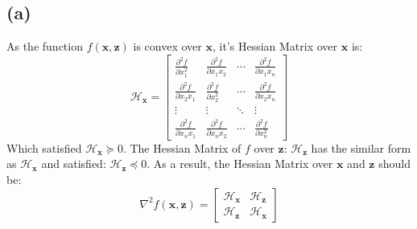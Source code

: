 \documentclass[10pt,a4paper]{article}
\begin{document}
\subsection*{(a)}
As the function $f(\mathbf{x}, \mathbf{z})$ is convex over $\mathbf{x}$, it's Hessian Matrix over $\mathbf{x}$ is:
\begin{equation*}
	\mathcal{H}_{\mathbf{x}} = \begin{bmatrix}
	\frac{\partial^{2} f}{\partial x_{1}^{2}} & \frac{\partial^{2} f}{\partial x_{1} x_{2}} & \cdots & \frac{\partial^{2} f}{\partial x_{1} x_{n}} \\
	\frac{\partial^{2} f}{\partial x_{2} x_{1}} & \frac{\partial^{2} f}{\partial x_{2}^{2}} & \cdots & \frac{\partial^{2} f}{\partial x_{2} x_{n}} \\
	\vdots & \vdots & \ddots & \vdots \\
	\frac{\partial^{2} f}{\partial x_{n} x_{1}} & \frac{\partial^{2} f}{\partial x_{n} x_{2}} & \cdots & \frac{\partial^{2} f}{\partial x_{n}^{2}}
	\end{bmatrix}
\end{equation*}
Which satisfied $\mathcal{H}_{\mathbf{x}} \succeq 0$. The Hessian Matrix of $f$ over $\mathbf{z}$: $\mathcal{H}_{\mathbf{z}}$ has the similar form as $\mathcal{H}_{\mathbf{x}}$ and satisfied: $\mathcal{H}_{\mathbf{z}} \preceq 0$. As a result, the Hessian Matrix over $\mathbf{x}$ and $\mathbf{z}$ should be:
\begin{equation*}
	\nabla^{2} f(\mathbf{x}, \mathbf{z}) = \begin{bmatrix}
	\mathcal{H}_{\mathbf{x}} & \mathcal{H}_{\mathbf{z}} \\
	\mathcal{H}_{\mathbf{z}} & \mathcal{H}_{\mathbf{x}}
	\end{bmatrix}
\end{equation*}
\end{document}
